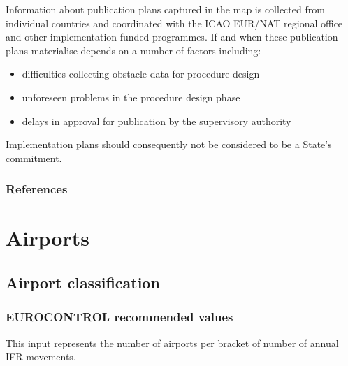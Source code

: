 \documentclass[
  11pt,
  a4paper,
]{book}
\begin{document}
Information about publication plans captured in the map is collected
from individual countries and coordinated with the ICAO EUR/NAT regional
office and other implementation-funded programmes. If and when these
publication plans materialise depends on a number of factors including:

\begin{itemize}
\item
  difficulties collecting obstacle data for procedure design
\item
  unforeseen problems in the procedure design phase
\item
  delays in approval for publication by the supervisory authority
\end{itemize}

Implementation plans should consequently not be considered to be a
State's commitment.

\hypertarget{references-30}{%
\section{References}\label{references-30}}

\part{Airports}

\hypertarget{sec-airport-classification}{%
\chapter{Airport classification}\label{sec-airport-classification}}

\hypertarget{eurocontrol-recommended-values-32}{%
\section{EUROCONTROL recommended
values}\label{eurocontrol-recommended-values-32}}

This input represents the number of airports per bracket of number of
annual IFR movements.
\end{document}
